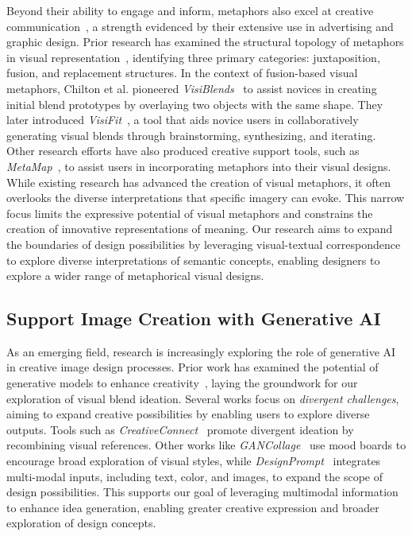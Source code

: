 Beyond their ability to engage and inform, metaphors also excel at creative communication~\cite{doi:10.1207/s15327868ms}, a strength evidenced by their extensive use in advertising and graphic design.
Prior research has examined the structural topology of metaphors in visual representation~\cite{Peterson02012019}, identifying three primary categories: juxtaposition, fusion, and replacement structures. 
In the context of fusion-based visual metaphors, Chilton et al. pioneered \textit{VisiBlends}~\cite{10.1145/3290605.3300402} to assist novices in creating initial blend prototypes by overlaying two objects with the same shape.
They later introduced \textit{VisiFit}~\cite{10.1145/3411764.3445089}, a tool that aids novice users in collaboratively generating visual blends through brainstorming, synthesizing, and iterating. 
Other research efforts have also produced creative support tools, such as \textit{MetaMap}~\cite{10.1145/3411764.3445325}, to assist users in incorporating metaphors into their visual designs.
While existing research has advanced the creation of visual metaphors, it often overlooks the diverse interpretations that specific imagery can evoke.
This narrow focus limits the expressive potential of visual metaphors and constrains the creation of innovative representations of meaning.  
Our research aims to expand the boundaries of design possibilities by leveraging visual-textual correspondence to explore diverse interpretations of semantic concepts, enabling designers to explore a wider range of metaphorical visual designs.



\subsection{Support Image Creation with Generative AI}


As an emerging field, research is increasingly exploring the role of generative AI in creative image design processes.
Prior work has examined the potential of generative models to enhance creativity~\cite{10.1145/3491101.3503549,10.1145/3664595}, laying the groundwork for our exploration of visual blend ideation.
Several works focus on \textit{divergent challenges}, aiming to expand creative possibilities by enabling users to explore diverse outputs.
Tools such as \textit{CreativeConnect}~\cite{10.1145/3613904.3642794} promote divergent ideation by recombining visual references.
Other works like \textit{GANCollage}~\cite{10.1145/3563657.3596072} use mood boards to encourage broad exploration of visual styles, while \textit{DesignPrompt}~\cite{10.1145/3643834.3661588} integrates multi-modal inputs, including text, color, and images, to expand the scope of design possibilities. 
This supports our goal of leveraging multimodal information to enhance idea generation, enabling greater creative expression and broader exploration of design concepts.


